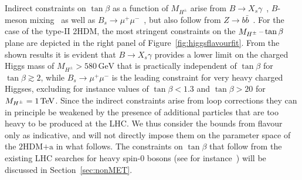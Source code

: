 \documentclass[review]{elsarticle}
\newcommand{\hdma}{\ensuremath{\textrm{2HDM+a}}\xspace}
\begin{document}
Indirect constraints on $\tan \beta$ as a function of $M_{H^\pm}$ arise from $B \to X_s \gamma$~\cite{Hermann:2012fc,Misiak:2015xwa,Misiak:2017bgg}, $B$-meson mixing~\cite{Abbott:1979dt,Geng:1988bq,Buras:1989ui,Kirk:2017juj} as well as  $B_s \to \mu^+ \mu^-$~\cite{Skiba:1992mg,Logan:2000iv,Chankowski:2000ng,Bobeth:2001sq,Bobeth:2013uxa,CMS:2014xfa,Aaij:2017vad}, but also follow from $Z \to b \bar b$~\cite{Denner:1991ie,Haisch:2007ia,Freitas:2012sy}. For the case of the type-II 2HDM, the most stringent constraints on the $M_{H^{\pm}}\hspace{0.5mm}$--$\hspace{0.5mm}\tan \beta$ plane are depicted in the right panel of Figure~\ref{fig:higgsflavourfit}. From the shown results it is evident that $B \to X_s \gamma$ provides a lower limit on the charged Higgs mass of $M_{H^\pm} > 580 \, {\mathrm{GeV}}$ that is practically independent of $\tan \beta$ for $\tan \beta \gtrsim 2$, while $B_s \to \mu^+ \mu^-$ is the leading constraint for very heavy charged Higgses, excluding for instance values of $\tan \beta <  1.3$ and $\tan \beta > 20$   for $M_{H^\pm} = 1 \, {\rm TeV}$.  Since the  indirect constraints   arise from loop corrections they can in principle be weakened by the presence of additional particles that are too heavy to be produced at the LHC. We thus consider the bounds from flavour only as indicative, and will not directly impose them on the parameter space of the \hdma in what follows. The constraints on $\tan \beta$ that follow from the existing LHC searches for heavy spin-0 bosons (see for instance~\cite{Aaboud:2017sjh,Sirunyan:2018zut,Aaboud:2017hnm,Sirunyan:2017roi,Aaboud:2018xuw}) will be discussed in Section~\ref{sec:nonMET}.
\end{document}
